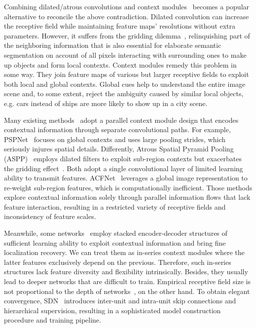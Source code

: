 \documentclass[journal]{IEEEtran}
\begin{document}
Combining dilated/atrous convolutions and context modules~\cite{chen2014semantic,yu2015multi,zhao2017pyramid,chen2017rethinking,zhang2018context,he2019adaptive,zhang2019co,fu2019dual,zhu2019asymmetric,zhang2019acfnet} becomes a popular alternative to reconcile the above contradiction. Dilated convolution can increase the receptive field while maintaining feature maps’ resolutions without extra parameters. However, it suffers from the gridding dilemma~\cite{wang2018understanding}, relinquishing part of the neighboring information that is also essential for elaborate semantic segmentation on account of all pixels interacting with surrounding ones to make up objects and form local contexts. Context modules remedy this problem in some way. They join feature maps of various but larger receptive fields to exploit both local and global contexts. Global cues help to understand the entire image scene and, to some extent, reject the ambiguity caused by similar local objects, e.g. cars instead of ships are more likely to show up in a city scene.

Many existing methods~\cite{zhao2017pyramid,chen2017rethinking,he2019adaptive,chen2017deeplab,chen2018encoder,li2018pyramidattention,liu2018semantic} adopt a parallel context module design that encodes contextual information through separate convolutional paths. For example, PSPNet~\cite{zhao2017pyramid} focuses on global contexts and uses large pooling strides, which seriously injures spatial details. Differently, Atrous Spatial Pyramid Pooling (ASPP)~\cite{chen2017rethinking,chen2018encoder} employs dilated filters to exploit sub-region contexts but exacerbates the gridding effect~\cite{wang2018understanding}. Both adopt a single convolutional layer of limited learning ability to transmit features. ACFNet~\cite{he2019adaptive} leverages a global image representation to re-weight sub-region features, which is computationally inefficient. Those methods explore contextual information solely through parallel information flows that lack feature interaction, resulting in a restricted variety of receptive fields and inconsistency of feature scales.

Meanwhile, some networks~\cite{newell2016stacked,fu2017densely,fu2019stacked} employ stacked encoder-decoder structures of sufficient learning ability to exploit contextual information and bring fine localization recovery. We can treat them as in-series context modules where the latter features exclusively depend on the previous. Therefore, such in-series structures lack feature diversity and flexibility intrinsically. Besides, they usually lead to deeper networks that are difficult to train. Empirical receptive field size is not proportional to the depth of networks~\cite{zhou2014object}, on the other hand. To obtain elegant convergence, SDN~\cite{fu2019stacked} introduces inter-unit and intra-unit skip connections and hierarchical supervision, resulting in a sophisticated model construction procedure and training pipeline.
\end{document}
